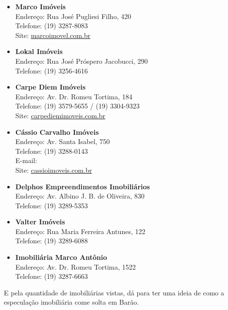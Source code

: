 \begin{itemize}
    \item   \textbf{Marco Imóveis}
        \\Endereço: Rua José Pugliesi Filho, 420
        \\Telefone: (19) 3287-8083
        \\Site: \url{marcoimovel.com.br}

    \item   \textbf{Lokal Imóveis}
        \\Endereço: Rua José Próspero Jacobucci, 290
        \\Telefone: (19) 3256-4616

    \item   \textbf{Carpe Diem Imóveis}
        \\Endereço: Av. Dr. Romeu Tortima, 184
        \\Telefone: (19) 3579-5655 / (19) 3304-9323
        \\Site: \url{carpediemimoveis.com.br}

    \item   \textbf{Cássio Carvalho Imóveis}
        \\Endereço: Av. Santa Isabel, 750
        \\Telefone: (19) 3288-0143
        \\E-mail: 
        \\Site: \url{cassioimoveis.com.br}

    \item   \textbf{Delphos Empreendimentos Imobiliários}
        \\Endereço: Av. Albino J. B. de Oliveira, 830
        \\Telefone: (19) 3289-5353

    \item   \textbf{Valter Imóveis}
        \\Endereço: Rua Maria Ferreira Antunes, 122
        \\Telefone: (19) 3289-6088

    \item   \textbf{Imobiliária Marco Antônio}
        \\Endereço: Av. Dr. Romeu Tortima, 1522
        \\Telefone: (19) 3287-6663

\end{itemize}

E pela quantidade de imobiliárias vistas, dá para ter uma ideia de como a 
especulação imobiliária come solta em Barão.
